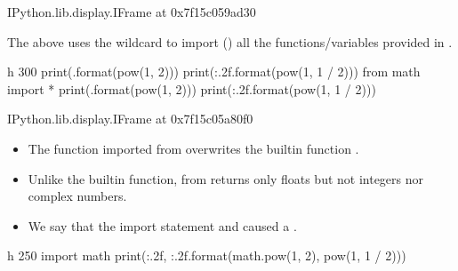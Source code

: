\documentclass[letterpaper,10pt,english]{sphinxmanual}
\begin{document}
\begin{sphinxVerbatim}[commandchars=\\\{\}]
\PYGZlt{}IPython.lib.display.IFrame at 0x7f15c059ad30\PYGZgt{}
\end{sphinxVerbatim}

The above uses the wildcard \sphinxcode{\sphinxupquote{*}} to import () all the functions/variables provided in .


\begin{sphinxVerbatim}[commandchars=\\\{\}]
 \PYGZhy{}h 300
print(\PYGZsq{}\PYGZob{}\PYGZcb{}\PYGZsq{}.format(pow(\PYGZhy{}1, 2)))
print(\PYGZsq{}\PYGZob{}:.2f\PYGZcb{}\PYGZsq{}.format(pow(\PYGZhy{}1, 1 / 2)))
from math import *
print(\PYGZsq{}\PYGZob{}\PYGZcb{}\PYGZsq{}.format(pow(\PYGZhy{}1, 2)))
print(\PYGZsq{}\PYGZob{}:.2f\PYGZcb{}\PYGZsq{}.format(pow(\PYGZhy{}1, 1 / 2)))
\end{sphinxVerbatim}

\begin{sphinxVerbatim}[commandchars=\\\{\}]
\PYGZlt{}IPython.lib.display.IFrame at 0x7f15c05a80f0\PYGZgt{}
\end{sphinxVerbatim}
\begin{itemize}
\item {} 
The function  imported from  overwrites the built\sphinxhyphen{}in function .

\item {} 
Unlike the built\sphinxhyphen{}in function,  from  returns only floats but not integers nor complex numbers.

\item {} 
We say that the import statement  and caused a .

\end{itemize}


\begin{sphinxVerbatim}[commandchars=\\\{\}]
 \PYGZhy{}h 250
import math
print(\PYGZsq{}\PYGZob{}:.2f\PYGZcb{}, \PYGZob{}:.2f\PYGZcb{}\PYGZsq{}.format(math.pow(\PYGZhy{}1, 2), pow(\PYGZhy{}1, 1 / 2)))
\end{sphinxVerbatim}
\end{document}
